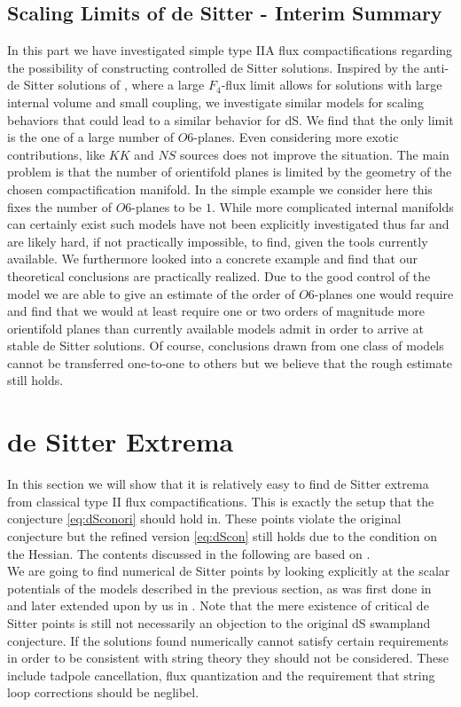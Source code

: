 \documentclass[a4paper,12pt,twoside,openright]{report}
\begin{document}
\subsection{Scaling Limits of de Sitter - Interim Summary}
In this part we have investigated simple type IIA flux compactifications regarding the possibility of constructing controlled de Sitter solutions. Inspired by the anti-de Sitter solutions of \cite{DeWolfe:2005uu}, where a large $F_4$-flux limit allows for solutions with large internal volume and small coupling, we investigate similar models for scaling behaviors that could lead to a similar behavior for dS. We find that the only limit is the one of a large number of $O6$-planes. Even considering more exotic contributions, like $KK$ and $NS$ sources does not improve the situation. The main problem is that the number of orientifold planes is limited by the geometry of the chosen compactification manifold. In the simple example we consider here this fixes the number of $O6$-planes to be $1$. While more complicated internal manifolds can certainly exist such models have not been explicitly investigated thus far and are likely hard, if not practically impossible, to find, given the tools currently available. We furthermore looked into a concrete example and find that our theoretical conclusions are practically realized. Due to the good control of the model we are able to give an estimate of the order of $O6$-planes one would require and find that we would at least require one or two orders of magnitude more orientifold planes than currently available models admit in order to arrive at stable de Sitter solutions. Of course, conclusions drawn from one class of models cannot be transferred one-to-one to others but we believe that the rough estimate still holds.

\section{de Sitter Extrema}
\label{sec:dSextrema}
In this section we will show that it is relatively easy to find de Sitter extrema from classical type II flux compactifications. This is exactly the setup that the conjecture \eqref{eq:dSconori} should hold in. These points violate the original conjecture but the refined version \eqref{eq:dScon} still holds due to the condition on the Hessian. The contents discussed in the following are based on \cite{Roupec:2018mbn}.\\
We are going to find numerical de Sitter points by looking explicitly at the scalar potentials of the models described in the previous section, as was first done in \cite{Caviezel:2008tf,Flauger:2008ad} and later extended upon by us in \cite{Roupec:2018mbn}. Note that the mere existence of critical de Sitter points is still not necessarily an objection to the original dS swampland conjecture. If the solutions found numerically cannot satisfy certain requirements in order to be consistent with string theory they should not be considered. These include tadpole cancellation, flux quantization and the requirement that string loop corrections should be neglibel.
\end{document}

